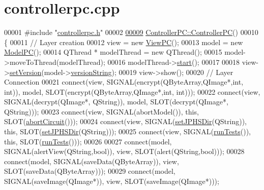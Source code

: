 \hypertarget{controllerpc_8cpp_source}{\section{controllerpc.\-cpp}
}

\begin{DoxyCode}
00001 \textcolor{preprocessor}{#include "\hyperlink{controllerpc_8h}{controllerpc.h}"}
00002 
\hypertarget{controllerpc_8cpp_source_l00009}{}\hyperlink{class_controller_p_c_afa6c92d67bf3b6531c42385fc5938003}{00009} \hyperlink{class_controller_p_c_afa6c92d67bf3b6531c42385fc5938003}{ControllerPC::ControllerPC}()
00010 \{
00011     \textcolor{comment}{// Layer creation}
00012     view = \textcolor{keyword}{new} \hyperlink{class_view_p_c}{ViewPC}();
00013     model = \textcolor{keyword}{new} \hyperlink{class_model_p_c}{ModelPC}();
00014     QThread * modelThread = \textcolor{keyword}{new} QThread();
00015     model->moveToThread(modelThread);
00016     modelThread->\hyperlink{class_model_p_c_a3cae34fd5bcb06e8c1f8cfe7961bd270}{start}();
00017 
00018     view->\hyperlink{class_view_p_c_ac05220df875b7c4f24405a5742476ebf}{setVersion}(model->\hyperlink{class_model_p_c_a5f426725ccf7eefd3c77ea8c720264c9}{versionString});
00019     view->show();
00020     \textcolor{comment}{// Layer Connection}
00021     connect(view, SIGNAL(encrypt(QByteArray,QImage*,\textcolor{keywordtype}{int}, \textcolor{keywordtype}{int})), model, SLOT(encrypt(QByteArray,QImage*,\textcolor{keywordtype}{int},
       \textcolor{keywordtype}{int})));
00022     connect(view, SIGNAL(decrypt(QImage*, QString)), model, SLOT(decrypt(QImage*, QString)));
00023     connect(view, SIGNAL(abortModel()), \textcolor{keyword}{this}, SLOT(\hyperlink{class_controller_p_c_a8814989f7be1214e06b2e720889066b0}{abortCircuit}()));
00024     connect(view, SIGNAL(\hyperlink{class_controller_p_c_ac00d29685a7e5b780c01eb438e10f96d}{setJPHSDir}(QString)), \textcolor{keyword}{this}, SLOT(\hyperlink{class_controller_p_c_ac00d29685a7e5b780c01eb438e10f96d}{setJPHSDir}(QString)));
00025     connect(view, SIGNAL(\hyperlink{class_controller_p_c_aaa59fc90e1ef731eee4560ec87e43707}{runTests}()), \textcolor{keyword}{this}, SLOT(\hyperlink{class_controller_p_c_aaa59fc90e1ef731eee4560ec87e43707}{runTests}()));
00026 
00027     connect(model, SIGNAL(alertView(QString,\textcolor{keywordtype}{bool})), view, SLOT(alert(QString,\textcolor{keywordtype}{bool})));
00028     connect(model, SIGNAL(saveData(QByteArray)), view, SLOT(saveData(QByteArray)));
00029     connect(model, SIGNAL(saveImage(QImage*)), view, SLOT(saveImage(QImage*)));

\end{DoxyCode}
